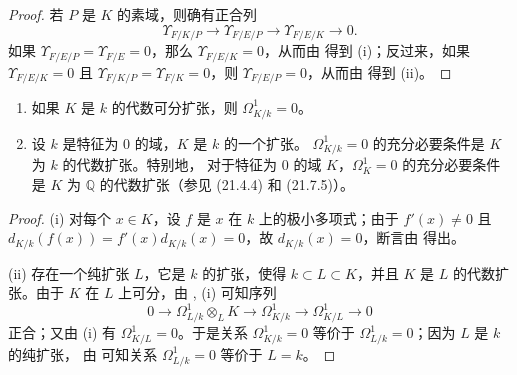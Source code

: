 \begin{proof}
若 $P$ 是 $K$ 的素域，则确有正合列 
\[
  \Upsilon_{F/K/P}\to\Upsilon_{F/E/P}\to\Upsilon_{F/E/K}\to0.
\]
如果 $\Upsilon_{F/E/P}=\Upsilon_{F/E}=0$，那么
$\Upsilon_{F/E/K}=0$，从而由  得到 (i)；反过来，如果
$\Upsilon_{F/E/K}=0$ 且 $\Upsilon_{F/K/P}=\Upsilon_{F/K}=0$，则
$\Upsilon_{F/E/P}=0$，从而由  得到 (ii)。
\end{proof}

\begin{corollary}[20.6.20]
\label{0.20.6.20-fr}
\begin{enumerate}
  \item[\rm(i)] 如果 $K$ 是 $k$ 的代数可分扩张，则
  $\Omega^1_{K/k}=0$。
  \item[\rm(ii)] 设 $k$ 是特征为 0 的域，$K$ 是 $k$ 的一个扩张。
  $\Omega^1_{K/k}=0$ 的充分必要条件是 $K$ 为 $k$ 的代数扩张。特别地，
  对于特征为 0 的域 $K$，$\Omega^1_K=0$ 的充分必要条件是 $K$ 为
  $\mathbb{Q}$ 的代数扩张（参见 (21.4.4) 和 (21.7.5)）。
\end{enumerate}
\end{corollary}

\begin{proof}
(i) 对每个 $x\in K$，设 $f$ 是 $x$ 在 $k$ 上的极小多项式；由于
$f'(x)\ne0$ 且 $d_{K/k}(f(x))=f'(x)d_{K/k}(x)=0$，故
$d_{K/k}(x)=0$，断言由  得出。

(ii) 存在一个纯扩张 $L$，它是 $k$ 的扩张，使得 $k\subset L\subset K$，并且
$K$ 是 $L$ 的代数扩张。由于 $K$ 在 $L$ 上可分，由
, (i) 可知序列 
\[
  0\to\Omega^1_{L/k}\otimes_L K\to\Omega^1_{K/k}
  \to\Omega^1_{K/L}\to0
\]
正合；又由 (i) 有 $\Omega^1_{K/L}=0$。于是关系
$\Omega^1_{K/k}=0$ 等价于 $\Omega^1_{L/k}=0$；因为 $L$ 是 $k$ 的纯扩张，
由  可知关系 $\Omega^1_{L/k}=0$ 等价于 $L=k$。
\end{proof}


